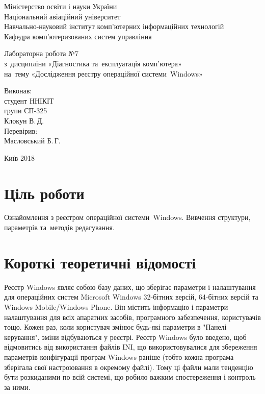 \documentclass[
	a4paper,
	oneside,
	DIV = 12,
	fontsize = 13pt,
	headings = normal,
]{scrartcl}
\newlength{\gridunitwidth}
\newcommand{\allcaps}[1]{{\addfontfeatures{LetterSpace = 5}#1}}
\begin{document}
\setlength{\gridunitwidth}{\textwidth / 12}
	\begin{titlepage}
		\begin{center}
			Міністерство освіти і науки України\\
			Національний авіаційний університет\\
			Навчально-науковий інститут комп'ютерних інформаційних технологій\\
			Кафедра комп'ютеризованих систем управління

			\vspace{\fill}
				Лабораторна робота №7\\
				з~дисципліни «Діагностика та~експлуатація комп'ютера»\\
				на~тему «Дослідження реєстру операційної системи~\textenglish{Windows}»\\

			\vspace{\fill}

			\begin{flushright}
				Виконав:\\
				студент \allcaps{ННІКІТ}\\
				групи СП-325\\
				Клокун В.\,Д.\\
				Перевірив:\\
				Масловський Б.\,Г.
			\end{flushright}

			Київ 2018
		\end{center}
	\end{titlepage}

	\section{Ціль роботи}
		Ознайомлення з реєстром операційної системи~\textenglish{Windows}. Вивчення структури, параметрів та~методів редагування.

	\section{Короткі теоретичні відомості}
		Реєстр Windows являє собою базу даних, що зберігає параметри і налаштування для операційних систем Microsoft Windows 32-бітних версій, 64-бітних версій та Windows Mobile/Windows Phone. Він містить інформацію і параметри налаштування для всіх апаратних засобів, програмного забезпечення, користувачів тощо. Кожен раз, коли користувач змінює будь-які параметри в "Панелі керування", зміни відбуваються у реєстрі. Реєстр Windows було введено, щоб відмовитись від використання файлів INI, що використовувалися для збереження параметрів конфігурації програм Windows раніше (тобто кожна програма зберігала свої настроювання в окремому файлі). Тому ці файли мали тенденцію бути розкиданими по всій системі, що робило важким спостереження і контроль за ними.
\end{document}
